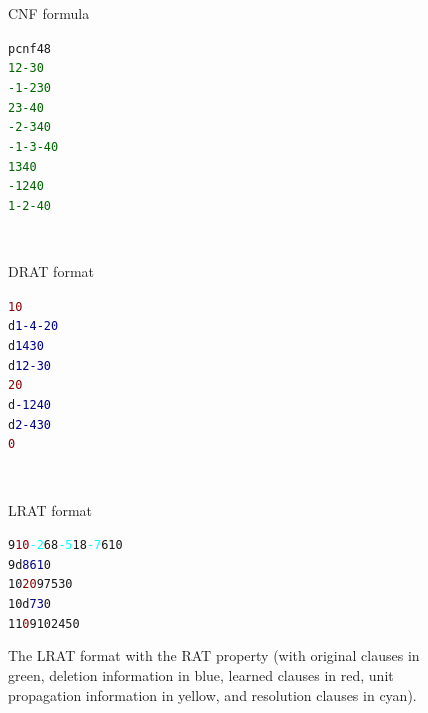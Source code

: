 \documentclass{article}
\begin{document}
\begin{figure}[t]
%
  \begin{minipage}[t]{0.205\textwidth}
CNF formula%
    \begin{alltt}
p cnf 4 8
\textcolor{darkgreen}{ 1  2 -3 0}
\textcolor{darkgreen}{-1 -2  3 0}
\textcolor{darkgreen}{ 2  3 -4 0}
\textcolor{darkgreen}{-2 -3  4 0}
\textcolor{darkgreen}{-1 -3 -4 0}
\textcolor{darkgreen}{ 1  3  4 0}
\textcolor{darkgreen}{-1  2  4 0}
\textcolor{darkgreen}{ 1 -2 -4 0}
    \end{alltt}
  \end{minipage}
%
%
%
%
%
%
%
%
~~~
  \begin{minipage}[t]{0.255\textwidth}
 DRAT format%
    \begin{alltt}
   \textcolor{darkred}{      1 0}
d \textcolor{darkblue}{ 1 -4 -2 0}
d \textcolor{darkblue}{ 1  4  3 0}
d \textcolor{darkblue}{ 1  2 -3 0}
   \textcolor{darkred}{      2 0}
d \textcolor{darkblue}{-1  2  4 0}
d \textcolor{darkblue}{ 2 -4  3 0}
   \textcolor{darkred}{        0}
    \end{alltt}
  \end{minipage}
~~~
  \begin{minipage}[t]{0.2425\textwidth}
LRAT format%
    \begin{alltt}
 9 \textcolor{darkred}{1 0} \textcolor{cyan}{-2} \textcolor{darkyellow}{6 8} \textcolor{cyan}{-5} \textcolor{darkyellow}{1 8} \textcolor{cyan}{-7} \textcolor{darkyellow}{6 1} 0
 9                  d \textcolor{darkblue}{8 6 1} 0
10 \textcolor{darkred}{2 0}              \textcolor{darkyellow}{9 7 5 3} 0
10                    d \textcolor{darkblue}{7 3} 0
11 \textcolor{darkred}{  0}           \textcolor{darkyellow}{9 10 2 4 5} 0
    \end{alltt}
  \end{minipage}
  \caption{The LRAT format with the RAT property (with original clauses in green, deletion information in blue, learned clauses in red, unit propagation information in yellow, and resolution clauses in cyan).}
  \label{fig:rat}
\end{figure}
\end{document}
